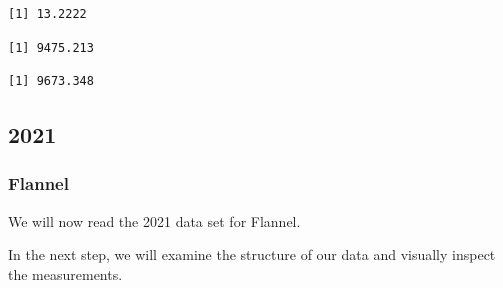\begin{verbatim}
[1] 13.2222
\end{verbatim}

\begin{Shaded}
\begin{Highlighting}[]
\SpecialCharTok{\$}
\end{Highlighting}
\end{Shaded}

\begin{verbatim}
[1] 9475.213
\end{verbatim}

\begin{Shaded}
\begin{Highlighting}[]
\SpecialCharTok{\$}
\end{Highlighting}
\end{Shaded}

\begin{verbatim}
[1] 9673.348
\end{verbatim}

\subsection{2021}

\subsubsection{Flannel}

We will now read the 2021 data set for Flannel.

\begin{Shaded}
\begin{Highlighting}[]
\OtherTok{\textless{}{-}} 
\OtherTok{\textless{}{-}} \NormalTok{(}\NormalTok{,}\NormalTok{))}
\end{Highlighting}
\end{Shaded}

In the next step, we will examine the structure of our data and visually
inspect the measurements.

\begin{Shaded}
\begin{Highlighting}[]
\end{Highlighting}
\end{Shaded}

